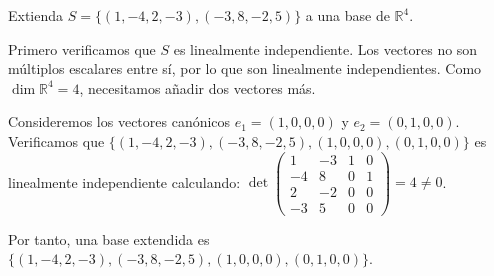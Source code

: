 \begin{prob} Extienda $S=\{(1,-4,2,-3), (-3,8,-2,5)\}$ a una base de $\mathbb{R}^4$.

\begin{myproof}
Primero verificamos que $S$ es linealmente independiente. Los vectores no son múltiplos escalares entre sí, por lo que son linealmente independientes. Como $\dim \mathbb{R}^4=4$, necesitamos añadir dos vectores más. 

Consideremos los vectores canónicos $e_1=(1,0,0,0)$ y $e_2=(0,1,0,0)$. Verificamos que $\{(1,-4,2,-3), (-3,8,-2,5), (1,0,0,0), (0,1,0,0)\}$ es linealmente independiente calculando: $\det \begin{pmatrix}
1 & -3 & 1 & 0 \\
-4 & 8 & 0 & 1 \\
2 & -2 & 0 & 0 \\
-3 & 5 & 0 & 0 
\end{pmatrix}= 4 \neq 0$.

Por tanto, una base extendida es $\{(1,-4,2,-3), (-3,8,-2,5), (1,0,0,0), (0,1,0,0)\}$.
\end{myproof}
\end{prob}

